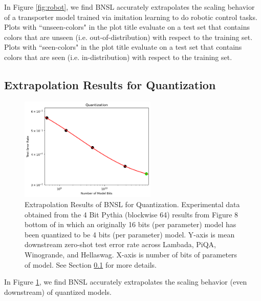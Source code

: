 \documentclass{article} %
\begin{document}
\vspace{-1.0mm}

In Figure \ref{fig:robot}, we find BNSL accurately extrapolates the scaling behavior of a transporter \citep{zeng2021transporter} model trained via imitation learning to do robotic control tasks. Plots with ``unseen-colors" in the plot title evaluate on a test set that contains colors that are unseen (i.e. out-of-distribution) with respect to the training set. Plots with ``seen-colors" in the plot title evaluate on a test set that contains colors that are seen (i.e. in-distribution) with respect to the training set.

\vspace{-1.0mm}

\clearpage

\subsection{Extrapolation Results for Quantization}
\label{section:quantization}
\vspace{-3.0mm}
\begin{figure}[htbp]
    \centering
\includegraphics[width=0.58\textwidth]{figures/quantization/quantization.png}
\vspace{-3.0mm}
    \caption{
Extrapolation Results of BNSL for Quantization. Experimental data obtained from the 4 Bit Pythia (blockwise 64) results from Figure 8 bottom of \cite{dettmers2022case} in which an originally 16 bits (per parameter) model has been quantized to be 4 bits (per parameter) model. Y-axis is mean downstream zero-shot test error rate across Lambada, PiQA, Winogrande, and Hellaswag. X-axis is number of bits of parameters of model. See Section \ref{section:quantization} for more details.
    }
    \label{fig:quantization}
\end{figure}
\vspace{-1.0mm}
In Figure \ref{fig:quantization}, we find BNSL accurately extrapolates the scaling behavior (even downstream) of quantized models.
\end{document}
